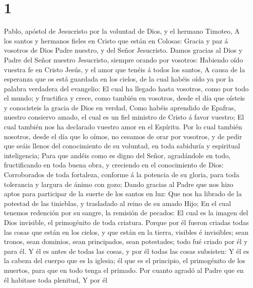 \hypertarget{section}{%
\section{1}\label{section}}

 Pablo, apóstol de Jesucristo por la voluntad de Dios, y el
hermano Timoteo,  A los santos y hermanos fieles en Cristo
que están en Colosas: Gracia y paz á vosotros de Dios Padre nuestro, y
del Señor Jesucristo.  Damos gracias al Dios y Padre del
Señor nuestro Jesucristo, siempre orando por vosotros: 
Habiendo oído vuestra fe en Cristo Jesús, y el amor que tenéis á todos
los santos,  A causa de la esperanza que os está guardada en
los cielos, de la cual habéis oído ya por la palabra verdadera del
evangelio:  El cual ha llegado hasta vosotros, como por todo
el mundo; y fructifica y crece, como también en vosotros, desde el día
que oísteis y conocisteis la gracia de Dios en verdad,  Como
habéis aprendido de Epafras, nuestro consiervo amado, el cual es un fiel
ministro de Cristo á favor vuestro;  El cual también nos ha
declarado vuestro amor en el Espíritu.  Por lo cual también
nosotros, desde el día que lo oímos, no cesamos de orar por vosotros, y
de pedir que seáis llenos del conocimiento de su voluntad, en toda
sabiduría y espiritual inteligencia;  Para que andéis como
es digno del Señor, agradándole en todo, fructificando en toda buena
obra, y creciendo en el conocimiento de Dios:  Corroborados
de toda fortaleza, conforme á la potencia de su gloria, para toda
tolerancia y largura de ánimo con gozo;  Dando gracias al
Padre que nos hizo aptos para participar de la suerte de los santos en
luz:  Que nos ha librado de la potestad de las tinieblas, y
trasladado al reino de su amado Hijo;  En el cual tenemos
redención por su sangre, la remisión de pecados:  El cual
es la imagen del Dios invisible, el primogénito de toda criatura.
 Porque por él fueron criadas todas las cosas que están en
los cielos, y que están en la tierra, visibles é invisibles; sean
tronos, sean dominios, sean principados, sean potestades; todo fué
criado por él y para él.  Y él es antes de todas las cosas,
y por él todas las cosas subsisten:  Y él es la cabeza del
cuerpo que es la iglesia; él que es el principio, el primogénito de los
muertos, para que en todo tenga el primado.  Por cuanto
agradó al Padre que en él habitase toda plenitud,  Y por él
